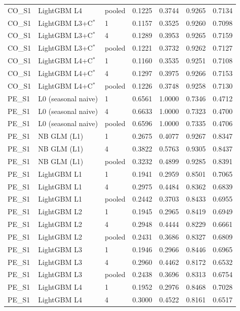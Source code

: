 \begin{tabular}{lllrrrr}
CO\_S1 & LightGBM L4 & pooled & 0.1225 & 0.3744 & 0.9265 & 0.7134 \\
CO\_S1 & LightGBM L3+C$^{*}$ & 1 & 0.1157 & 0.3525 & 0.9260 & 0.7098 \\
CO\_S1 & LightGBM L3+C$^{*}$ & 4 & 0.1289 & 0.3953 & 0.9265 & 0.7159 \\
CO\_S1 & LightGBM L3+C$^{*}$ & pooled & 0.1221 & 0.3732 & 0.9262 & 0.7127 \\
CO\_S1 & LightGBM L4+C$^{*}$ & 1 & 0.1160 & 0.3535 & 0.9251 & 0.7108 \\
CO\_S1 & LightGBM L4+C$^{*}$ & 4 & 0.1297 & 0.3975 & 0.9266 & 0.7153 \\
CO\_S1 & LightGBM L4+C$^{*}$ & pooled & 0.1226 & 0.3748 & 0.9258 & 0.7130 \\
PE\_S1 & L0 (seasonal naive) & 1 & 0.6561 & 1.0000 & 0.7346 & 0.4712 \\
PE\_S1 & L0 (seasonal naive) & 4 & 0.6633 & 1.0000 & 0.7323 & 0.4700 \\
PE\_S1 & L0 (seasonal naive) & pooled & 0.6596 & 1.0000 & 0.7335 & 0.4706 \\
PE\_S1 & NB GLM (L1) & 1 & 0.2675 & 0.4077 & 0.9267 & 0.8347 \\
PE\_S1 & NB GLM (L1) & 4 & 0.3822 & 0.5763 & 0.9305 & 0.8437 \\
PE\_S1 & NB GLM (L1) & pooled & 0.3232 & 0.4899 & 0.9285 & 0.8391 \\
PE\_S1 & LightGBM L1 & 1 & 0.1941 & 0.2959 & 0.8501 & 0.7065 \\
PE\_S1 & LightGBM L1 & 4 & 0.2975 & 0.4484 & 0.8362 & 0.6839 \\
PE\_S1 & LightGBM L1 & pooled & 0.2442 & 0.3703 & 0.8433 & 0.6955 \\
PE\_S1 & LightGBM L2 & 1 & 0.1945 & 0.2965 & 0.8419 & 0.6949 \\
PE\_S1 & LightGBM L2 & 4 & 0.2948 & 0.4444 & 0.8229 & 0.6661 \\
PE\_S1 & LightGBM L2 & pooled & 0.2431 & 0.3686 & 0.8327 & 0.6809 \\
PE\_S1 & LightGBM L3 & 1 & 0.1946 & 0.2966 & 0.8446 & 0.6965 \\
PE\_S1 & LightGBM L3 & 4 & 0.2960 & 0.4462 & 0.8172 & 0.6532 \\
PE\_S1 & LightGBM L3 & pooled & 0.2438 & 0.3696 & 0.8313 & 0.6754 \\
PE\_S1 & LightGBM L4 & 1 & 0.1952 & 0.2976 & 0.8468 & 0.7028 \\
PE\_S1 & LightGBM L4 & 4 & 0.3000 & 0.4522 & 0.8161 & 0.6517 \\

\end{tabular}

